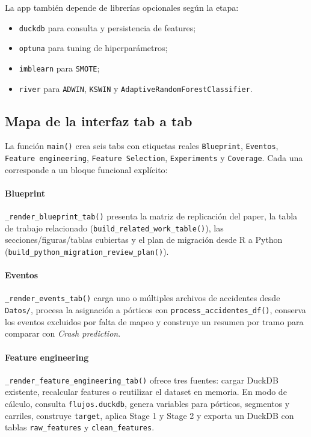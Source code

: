 La app tambi\'en depende de librer\'ias opcionales seg\'un la etapa:
\begin{itemize}[leftmargin=*]
  \item \texttt{duckdb} para consulta y persistencia de features;
  \item \texttt{optuna} para tuning de hiperpar\'ametros;
  \item \texttt{imblearn} para \texttt{SMOTE};
  \item \texttt{river} para \texttt{ADWIN}, \texttt{KSWIN} y \texttt{AdaptiveRandomForestClassifier}.
\end{itemize}

\subsection{Mapa de la interfaz tab a tab}
La funci\'on \texttt{main()} crea seis tabs con etiquetas reales \texttt{Blueprint}, \texttt{Eventos}, \texttt{Feature engineering}, \texttt{Feature Selection}, \texttt{Experiments} y \texttt{Coverage}. Cada una corresponde a un bloque funcional expl\'icito:

\paragraph{Blueprint}
\texttt{\_render\_blueprint\_tab()} presenta la matriz de replicaci\'on del paper, la tabla de trabajo relacionado (\texttt{build\_related\_work\_table()}), las secciones/figuras/tablas cubiertas y el plan de migraci\'on desde R a Python (\texttt{build\_python\_migration\_review\_plan()}).

\paragraph{Eventos}
\texttt{\_render\_events\_tab()} carga uno o m\'ultiples archivos de accidentes desde \texttt{Datos/}, procesa la asignaci\'on a p\'orticos con \texttt{process\_accidentes\_df()}, conserva los eventos excluidos por falta de mapeo y construye un resumen por tramo para comparar con \textit{Crash prediction}.

\paragraph{Feature engineering}
\texttt{\_render\_feature\_engineering\_tab()} ofrece tres fuentes: cargar DuckDB existente, recalcular features o reutilizar el dataset en memoria. En modo de c\'alculo, consulta \texttt{flujos.duckdb}, genera variables para p\'orticos, segmentos y carriles, construye \texttt{target}, aplica Stage 1 y Stage 2 y exporta un DuckDB con tablas \texttt{raw\_features} y \texttt{clean\_features}.

